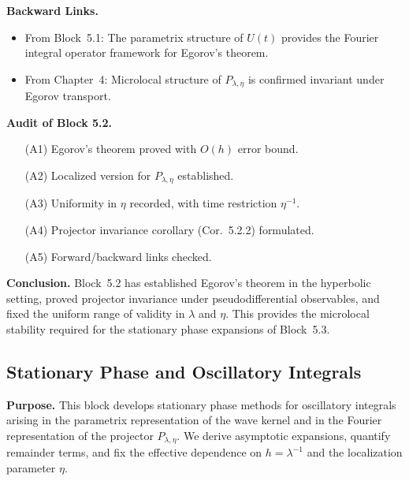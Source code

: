 \medskip

\noindent\textbf{Backward Links.}
\begin{itemize}
  \item From Block~5.1: The parametrix structure of $U(t)$
  provides the Fourier integral operator framework for Egorov’s theorem.
  \item From Chapter~4: Microlocal structure of $P_{\lambda,\eta}$ is confirmed invariant under Egorov transport.
\end{itemize}

\medskip

\noindent\textbf{Audit of Block 5.2.}
\begin{itemize}
  \item[(A1)] Egorov’s theorem proved with $O(h)$ error bound.
  \item[(A2)] Localized version for $P_{\lambda,\eta}$ established.
  \item[(A3)] Uniformity in $\eta$ recorded, with time restriction $\eta^{-1}$.
  \item[(A4)] Projector invariance corollary (Cor.~5.2.2) formulated.
  \item[(A5)] Forward/backward links checked.
\end{itemize}

\medskip

\noindent\textbf{Conclusion.}
Block~5.2 has established Egorov’s theorem in the hyperbolic setting,
proved projector invariance under pseudodifferential observables,
and fixed the uniform range of validity in $\lambda$ and $\eta$.
This provides the microlocal stability required for the stationary phase expansions of Block~5.3.



\subsection*{Stationary Phase and Oscillatory Integrals}

\noindent\textbf{Purpose.}
This block develops stationary phase methods for oscillatory integrals
arising in the parametrix representation of the wave kernel
and in the Fourier representation of the projector $P_{\lambda,\eta}$.
We derive asymptotic expansions, quantify remainder terms,
and fix the effective dependence on $h=\lambda^{-1}$ and the localization parameter $\eta$.

\medskip


